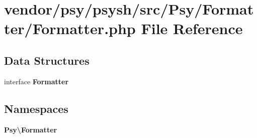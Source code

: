 \section{vendor/psy/psysh/src/\+Psy/\+Formatter/\+Formatter.php File Reference}
\label{psy_2psysh_2src_2_psy_2_formatter_2_formatter_8php}
\subsection*{Data Structures}
\begin{DoxyCompactItemize}
\item 
interface {\bf Formatter}
\end{DoxyCompactItemize}
\subsection*{Namespaces}
\begin{DoxyCompactItemize}
\item 
 {\bf Psy\textbackslash{}\+Formatter}
\end{DoxyCompactItemize}

